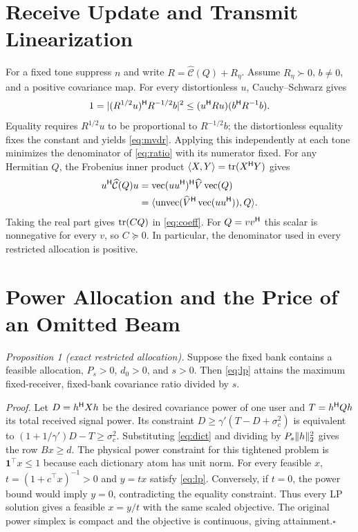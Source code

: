 \appendices
\section{Receive Update and Transmit Linearization}\label{ap:rx}
For a fixed tone suppress $n$ and write $R=\widehat{\mathcal C}(Q)+R_\eta$. Assume $R_\eta\succ0$, $b\ne0$, and a positive covariance map. For every distortionless $u$, Cauchy--Schwarz gives
\begin{equation}
 1=|(R^{1/2}u)^{\mathsf H} R^{-1/2}b|^2
 \le (u^{\mathsf H} Ru)(b^{\mathsf H} R^{-1}b).
\end{equation}
Equality requires $R^{1/2}u$ to be proportional to $R^{-1/2}b$; the distortionless equality fixes the constant and yields \eqref{eq:mvdr}. Applying this independently at each tone minimizes the denominator of \eqref{eq:ratio} with its numerator fixed. For any Hermitian $Q$, the Frobenius inner product $\langle X,Y\rangle=\operatorname{tr}(X^{\mathsf H} Y)$ gives
\begin{align}
 u^{\mathsf H}\widehat{\mathcal C}(Q)u
 &=\operatorname{vec}(uu^{\mathsf H})^{\mathsf H}\widehat V\operatorname{vec}(Q)\\
 &=\langle\operatorname{unvec}(\widehat V^{\mathsf H}\operatorname{vec}(uu^{\mathsf H})),Q\rangle .
\end{align}
Taking the real part gives $\operatorname{tr}(CQ)$ in \eqref{eq:coeff}. For $Q=vv^{\mathsf H}$ this scalar is nonnegative for every $v$, so $C\succeq0$. In particular, the denominator used in every restricted allocation is positive.
\section{Power Allocation and the Price of an Omitted Beam}\label{ap:price}
\emph{Proposition 1 (exact restricted allocation).} Suppose the fixed bank contains a feasible allocation, $P_s>0$, $d_0>0$, and $s>0$. Then \eqref{eq:lp} attains the maximum fixed-receiver, fixed-bank covariance ratio divided by $s$.
\par\emph{Proof.} Let $D=h^{\mathsf H} Xh$ be the desired covariance power of one user and $T=h^{\mathsf H} Qh$ its total received signal power. Its constraint $D\ge\gamma'(T-D+\sigma_c^2)$ is equivalent to $(1+1/\gamma')D-T\ge\sigma_c^2$. Substituting \eqref{eq:dict} and dividing by $P_s\lVert h\rVert_2^2$ gives the row $Bx\ge d$. The physical power constraint for this tightened problem is $\mathbf1^\top x\le1$ because each dictionary atom has unit norm. For every feasible $x$, $t=(1+c^\top x)^{-1}>0$ and $y=tx$ satisfy \eqref{eq:lp}. Conversely, if $t=0$, the power bound would imply $y=0$, contradicting the equality constraint. Thus every LP solution gives a feasible $x=y/t$ with the same scaled objective. The original power simplex is compact and the objective is continuous, giving attainment.\hfill$\square$

